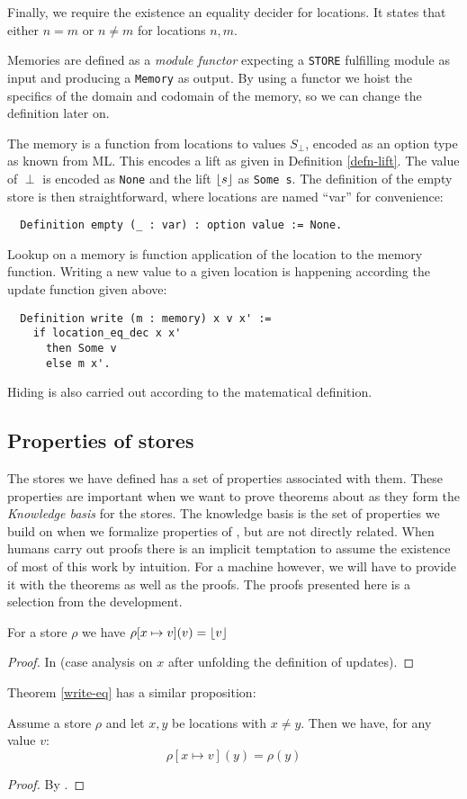Finally, we require the existence an equality decider for
locations. It states that either $n = m$ or $n \neq m$ for locations
$n, m$.

Memories are defined as a \emph{module functor} expecting a
\texttt{STORE} fulfilling module as input and producing a
\texttt{Memory} as output. By using a functor we hoist the specifics
of the domain and codomain of the memory, so we can change the
definition later on.

The memory is a function from locations to values $S_{\perp}$, encoded
as an option type as known from ML. This encodes a lift as given in
Definition \ref{defn-lift}. The value of $\perp$ is encoded as
\texttt{None} and the lift $\lfloor s \rfloor$ as \texttt{Some s}. The
definition of the empty store is then straightforward, where locations
are named ``var'' for convenience:
\begin{verbatim}
  Definition empty (_ : var) : option value := None.
\end{verbatim}
Lookup on a memory is function application of the location to the
memory function. Writing a new value to a given location is happening
according the update function given above:
\begin{verbatim}
  Definition write (m : memory) x v x' :=
    if location_eq_dec x x'
      then Some v
      else m x'.
\end{verbatim}
Hiding is also carried out according to the matematical definition.

\subsection{Properties of stores}

The stores we have defined has a set of properties associated with
them. These properties are important when we want to prove theorems
about \janusz{} as they form the \emph{Knowledge basis} for the
stores. The knowledge basis is the set of properties we build on when
we formalize properties of \janusz{}, but are not directly
related. When humans carry out proofs there is an implicit temptation
to assume the existence of most of this work by intuition. For a
machine however, we will have to provide it with the theorems as well
as the proofs. The proofs presented here is a selection from the
development.

\begin{thm}
  \label{write-eq}
  For a store $\rho$ we have $\rho[x \mapsto v](v) = \lfloor v \rfloor$
\end{thm}
\begin{proof}
  In \coq{} (case analysis on $x$ after unfolding the definition of updates).
\end{proof}
Theorem \ref{write-eq} has a similar proposition:
\begin{thm}
  Assume a store $\rho$ and let $x, y$ be locations with $x \neq
  y$. Then we have, for any value $v$:
  \begin{equation*}
    \rho[x \mapsto v](y) = \rho(y)
  \end{equation*}
\end{thm}
\begin{proof}
  By \coq{}.
\end{proof}


